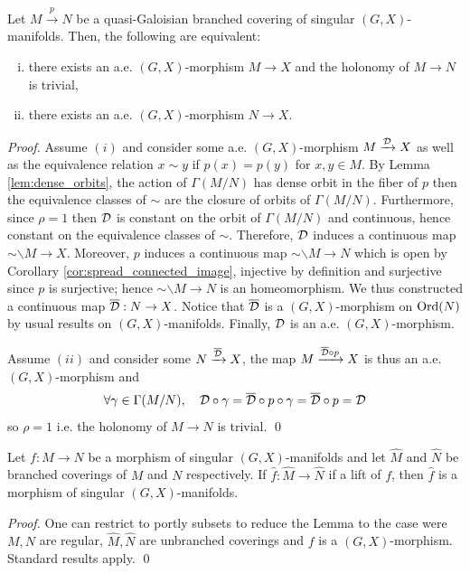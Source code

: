 
  
\begin{lem}\label{lem:descend_developing_map} Let $M\xrightarrow{p} N$ be a quasi-Galoisian branched covering of singular $(G,X)$-manifolds. Then, the following are equivalent:
\begin{enumerate}[(i)]
 \item there exists an a.e. $(G,X)$-morphism $M\rightarrow X$ and the holonomy of $M\rightarrow N$ is trivial,
 \item there exists an a.e. $(G,X)$-morphism $N\rightarrow X$. 
\end{enumerate} 
\end{lem}
\begin{proof}
 Assume $(i)$ and consider some a.e. $(G,X)$-morphism $M\xrightarrow{\mathcal{D}} X$ as well as the equivalence relation $x\sim y$ if $p(x)=p(y)$ for $x,y\in M$.
 By Lemma \ref{lem:dense_orbits}, the action of $\Gamma(M/N)$ has dense 
 orbit in the fiber of $p$ then the equivalence classes of $\sim$ are 
 the closure of orbits of $\Gamma(M/N)$. Furthermore, since $\rho=1$ 
 then $\mathcal{D}$ is constant on the orbit of $\Gamma(M/N)$ and continuous, hence constant on the equivalence classes of $\sim$. Therefore, $\mathcal{D}$ induces a continuous map $\sim\backslash M \rightarrow X$. Moreover, $p$ induces a continuous map $\sim\backslash M \rightarrow N$ which is open by Corollary \ref{cor:spread_connected_image}, injective by definition and surjective since $p$ is surjective; hence $\sim\backslash M \rightarrow N$ is an homeomorphism. We thus constructed a continuous map $\overline {\mathcal{D}}:N \rightarrow X$. Notice that $\overline {\mathcal{D}}$ is a $(G,X)$-morphism on $\mathrm{Ord}(N)$ by usual results on $(G,X)$-manifolds. Finally, $\mathcal{D}$ is an a.e. $(G,X)$-morphism. 
 
 Assume $(ii)$ and consider some $N\xrightarrow{\overline {\mathcal{D}}} X$, the map $ M \xrightarrow{\overline {\mathcal{D}} \circ p} X$ is thus an a.e. $(G,X)$-morphism and 
 $$\forall \gamma\in \Gamma(M/N),\quad \mathcal{D}\circ\gamma =  \overline {\mathcal{D}}\circ p\circ \gamma = \overline {\mathcal{D}}\circ p = \mathcal{D} $$
 so $\rho= 1$ i.e. the holonomy of $M\rightarrow N$ is trivial. 
\qed\end{proof}


\begin{lem}\label{lem:morphism_singular_manifolds_branched}
 Let $f:M\rightarrow N$ be a morphism of singular $(G,X)$-manifolds and let $\hat M$ and $\hat N$ be branched coverings of $M$ and $N$ respectively. 
If $\hat f:\hat M \rightarrow \hat N$ if a lift of $f$, then $\hat f$ is a morphism of singular $(G,X)$-manifolds.
\end{lem}
\begin{proof}
One can restrict to portly subsets to reduce the Lemma to the case were $M,N$ are regular, $\hat M,\hat N$ are unbranched coverings and $f$ is a $(G,X)$-morphism. Standard results apply. 
\qed\end{proof}

